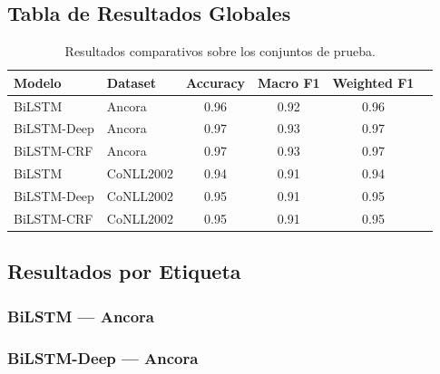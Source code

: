 \documentclass[12pt, a4paper]{article}
\begin{document}
\subsection{Tabla de Resultados Globales}

\begin{table}[H]
    \centering
    \caption{Resultados comparativos sobre los conjuntos de prueba.}
    \label{tab:results}
    \begin{tabular}{llcccc}
        \toprule
        \textbf{Modelo}  & \textbf{Dataset}  & \textbf{Accuracy} & \textbf{Macro F1} & \textbf{Weighted F1} \\
        \midrule
        BiLSTM           & Ancora            & 0.96               & 0.92                & 0.96              \\
        BiLSTM-Deep      & Ancora            & 0.97               & 0.93                & 0.97               \\
        BiLSTM-CRF       & Ancora            & 0.97               & 0.93                & 0.97              \\
        \midrule
        BiLSTM           & CoNLL2002         & 0.94               & 0.91               & 0.94               \\
        BiLSTM-Deep      & CoNLL2002         & 0.95               & 0.91                & 0.95               \\
        BiLSTM-CRF       & CoNLL2002         & 0.95              & 0.91                & 0.95               \\
        \bottomrule
    \end{tabular}
\end{table}

\subsection{Resultados por Etiqueta}


\subsubsection{BiLSTM — Ancora}


\subsubsection{BiLSTM-Deep — Ancora}

\end{document}
